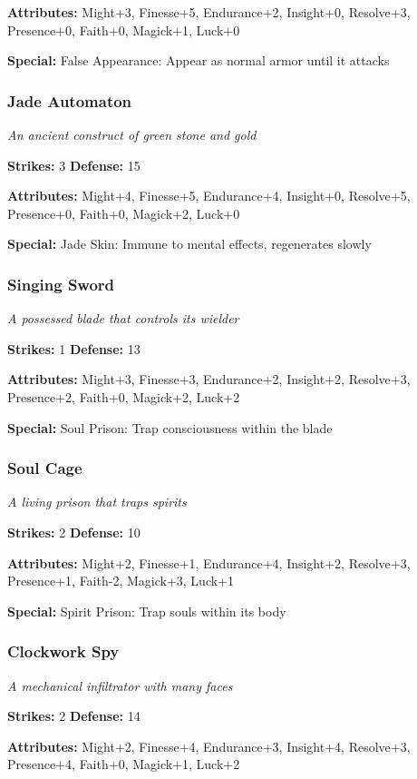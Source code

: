 \documentclass[10pt,twoside]{article}
\begin{document}
\textbf{Attributes:} Might+3, Finesse+5, Endurance+2, Insight+0, Resolve+3, Presence+0, Faith+0, Magick+1, Luck+0

\textbf{Special:} False Appearance: Appear as normal armor until it attacks

\subsubsection{Jade Automaton}
\textit{An ancient construct of green stone and gold}

\textbf{Strikes:} 3 \quad \textbf{Defense:} 15

\textbf{Attributes:} Might+4, Finesse+5, Endurance+4, Insight+0, Resolve+5, Presence+0, Faith+0, Magick+2, Luck+0

\textbf{Special:} Jade Skin: Immune to mental effects, regenerates slowly

\subsubsection{Singing Sword}
\textit{A possessed blade that controls its wielder}

\textbf{Strikes:} 1 \quad \textbf{Defense:} 13

\textbf{Attributes:} Might+3, Finesse+3, Endurance+2, Insight+2, Resolve+3, Presence+2, Faith+0, Magick+2, Luck+2

\textbf{Special:} Soul Prison: Trap consciousness within the blade

\subsubsection{Soul Cage}
\textit{A living prison that traps spirits}

\textbf{Strikes:} 2 \quad \textbf{Defense:} 10

\textbf{Attributes:} Might+2, Finesse+1, Endurance+4, Insight+2, Resolve+3, Presence+1, Faith-2, Magick+3, Luck+1

\textbf{Special:} Spirit Prison: Trap souls within its body

\subsubsection{Clockwork Spy}
\textit{A mechanical infiltrator with many faces}

\textbf{Strikes:} 2 \quad \textbf{Defense:} 14

\textbf{Attributes:} Might+2, Finesse+4, Endurance+3, Insight+4, Resolve+3, Presence+4, Faith+0, Magick+1, Luck+2
\end{document}
